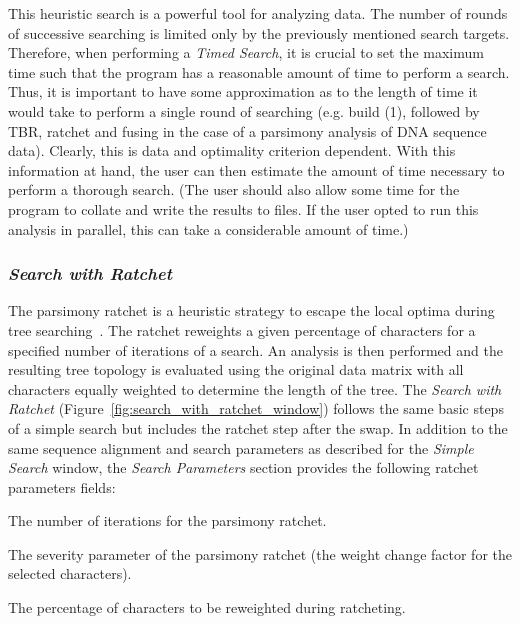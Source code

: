 {This heuristic search is a powerful tool for analyzing data. The number of rounds of successive searching is limited only by the previously mentioned search targets. Therefore, when performing a \emph{Timed Search}, it is crucial to set the maximum time such that the program has a reasonable amount of time to perform a search.  Thus, it is important to have some approximation as to the length of time it would take to perform a single round of searching (e.g. build (1), followed by TBR, ratchet and fusing in the case of a parsimony analysis of DNA sequence data).  Clearly, this is data and optimality criterion dependent.  With this information at hand, the user can then estimate the amount of time necessary to perform a thorough search.  (The user should also allow some time for the program to collate and write the results to files.  If the user opted to run this analysis in parallel, this can take a considerable amount of time.)

\subsubsection*{\emph{Search with Ratchet}}

The parsimony ratchet is a heuristic strategy to escape the local optima during tree searching~\cite{Nixon1999}. The ratchet reweights a given percentage of characters for a specified number of iterations of a search. An analysis is then performed and the resulting tree topology is evaluated using the original data matrix with all characters equally weighted to determine the length of the tree. The \emph{Search with Ratchet} (Figure~\ref{fig:search_with_ratchet_window}) follows the same basic steps of a simple search but includes the ratchet step after the swap. In addition to the same sequence alignment and search parameters as described for the \emph{Simple Search} window, the \emph{Search Parameters} section provides the following ratchet parameters fields:

\begin{description}
\setlength{\labelsep}{5pt}
\setlength{\itemindent}{0pt}%
    \item[Ratchet iterations] The number of iterations for the parsimony
        ratchet.
    \item[Severity] The severity parameter of the parsimony ratchet (the weight
        change factor for the selected characters).
    \item[Percentage] The percentage of characters to be reweighted during ratcheting.
\end{description}

}
